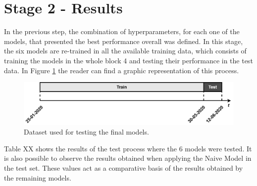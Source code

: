 \section{Stage 2 - Results}\label{chap3:section:stage_2}

In the previous step, the combination of hyperparameters, for each one of the models, that presented the best performance overall was defined. In this stage, the six models are re-trained in all the available training data, which consists of training the models in the whole block 4 and testing their performance in the test data. In Figure \ref{test} the reader can find a graphic representation of this process.

\begin{figure}[h!]
    \centering
    \begin{center}
    \includegraphics[width=1\textwidth]{Images/test2.png}
    \caption{Dataset used for testing the final models.}
    \label{test}
    \end{center}
\end{figure}

Table XX shows the results of the test process where the 6 models were tested. It is also possible to observe the results obtained when applying the Naive Model in the test set. These values act as a comparative basis of the results obtained by the remaining models.


